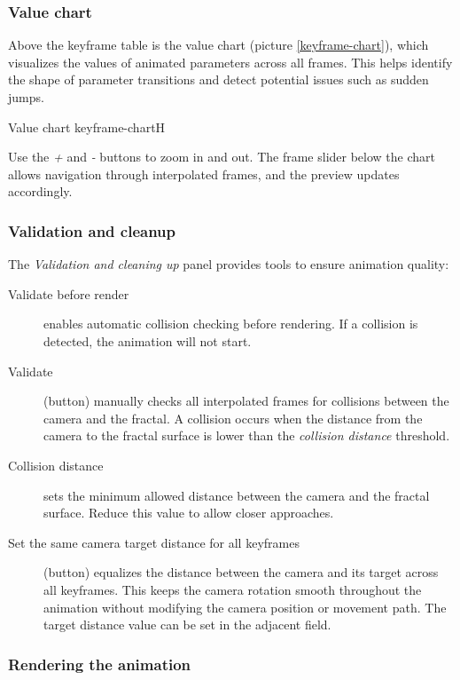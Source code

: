 \subsubsection{Value chart}

Above the keyframe table is the value chart (picture \ref{keyframe-chart}), which visualizes the values of animated parameters across all frames. This helps identify the shape of parameter transitions and detect potential issues such as sudden jumps.

{Value chart}
{keyframe-chart}{H}

Use the \emph{+} and \emph{-} buttons to zoom in and out. The frame slider below the chart allows navigation through interpolated frames, and the preview updates accordingly.

\subsubsection{Validation and cleanup}

The \emph{Validation and cleaning up} panel provides tools to ensure animation quality:

\begin{description}
	\item[Validate before render] enables automatic collision checking before rendering. If a collision is detected, the animation will not start.
	
	\item[Validate] (button) manually checks all interpolated frames for collisions between the camera and the fractal. A collision occurs when the distance from the camera to the fractal surface is lower than the \emph{collision distance} threshold.
	
	\item[Collision distance] sets the minimum allowed distance between the camera and the fractal surface. Reduce this value to allow closer approaches.
	
	\item[Set the same camera target distance for all keyframes] (button) equalizes the distance between the camera and its target across all keyframes. This keeps the camera rotation smooth throughout the animation without modifying the camera position or movement path. The target distance value can be set in the adjacent field.
\end{description}

\subsubsection{Rendering the animation}

